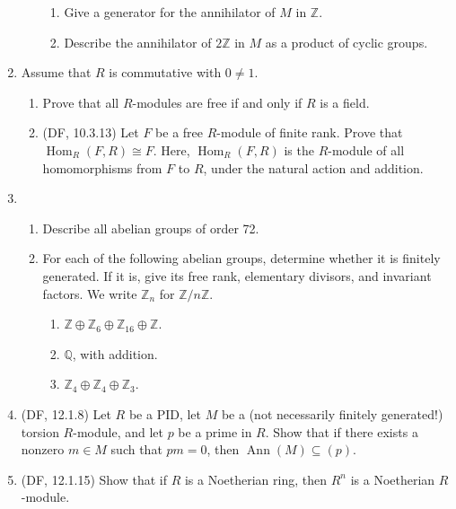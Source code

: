 \documentclass{amsart}
\theoremstyle{definition}
\newcommand{\Zz}{\mathbb{Z}}
\newcommand{\Qq}{\mathbb{Q}}
\newcommand{\Hom}{\operatorname{Hom}}
\newcommand{\Ann}{\operatorname{Ann}}
\begin{document}
\begin{enumerate}
\begin{enumerate}
    \begin{enumerate}
    \item Give a generator for the annihilator of $M$ in $\Zz$.
    \item Describe the annihilator of $2\Zz$ in $M$ as a product of cyclic groups.
    \end{enumerate}
  \end{enumerate}
\item Assume that $R$ is commutative with $0 \neq 1$. 
  \begin{enumerate}
  \item Prove that all $R$-modules are free if and only if $R$ is a field.
  \item (DF, 10.3.13) Let $F$ be a free $R$-module of finite rank. Prove that $\Hom_R (F, R) \cong F$. Here, $\Hom_R (F, R)$ is the $R$-module of all homomorphisms from $F$ to $R$, under the natural action and addition.
  \end{enumerate}
\item
  \begin{enumerate}
  \item Describe all abelian groups of order 72.
  \item For each of the following abelian groups, determine whether it is finitely generated. If it is, give its free rank, elementary divisors, and invariant factors. We write $\Zz_n$ for $\Zz / n \Zz$.
    \begin{enumerate}
    \item $\Zz \oplus \Zz_6 \oplus \Zz_{16} \oplus \Zz$.
    \item $\Qq$, with addition.
    \item $\Zz_4 \oplus \Zz_4 \oplus \Zz_3$.
    \end{enumerate}
  \end{enumerate}
\item (DF, 12.1.8) Let $R$ be a PID, let $M$ be a (not necessarily finitely generated!) torsion $R$-module, and let $p$ be a prime in $R$. Show that if there exists a nonzero $m \in M$ such that $pm = 0$, then $\Ann (M)  \subseteq (p)$.
\item (DF, 12.1.15) Show that if $R$ is a Noetherian ring, then $R^n$ is a Noetherian $R$-module.
\end{enumerate}
\end{document}
